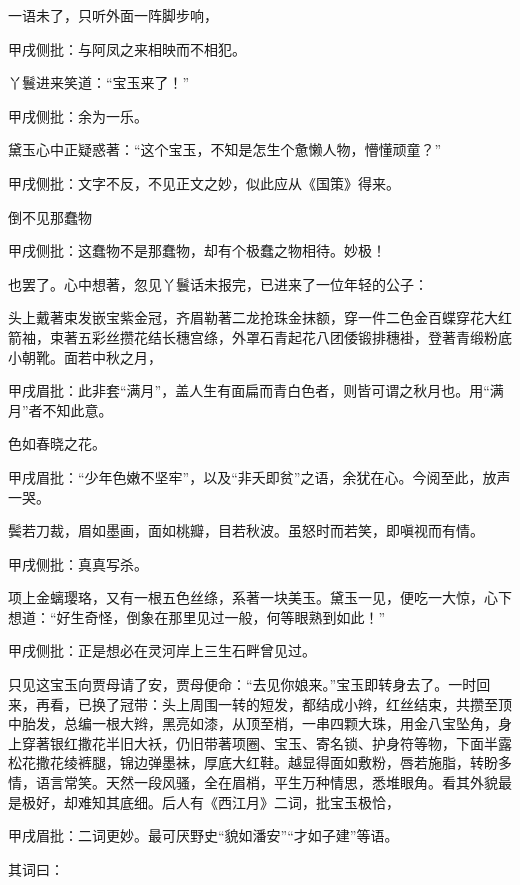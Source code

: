 \begin{parag}
    一语未了，只听外面一阵脚步响，\begin{note}甲戌侧批：与阿凤之来相映而不相犯。\end{note}丫鬟进来笑道：“宝玉来了！”\begin{note}甲戌侧批：余为一乐。\end{note}黛玉心中正疑惑著：“这个宝玉，不知是怎生个惫懒人物，懵懂顽童？”\begin{note}甲戌侧批：文字不反，不见正文之妙，似此应从《国策》得来。\end{note}倒不见那蠢物\begin{note}甲戌侧批：这蠢物不是那蠢物，却有个极蠢之物相待。妙极！\end{note}也罢了。心中想著，忽见丫鬟话未报完，已进来了一位年轻的公子：
\end{parag}

\begin{qute2sp}
    头上戴著束发嵌宝紫金冠，齐眉勒著二龙抢珠金抹额，穿一件二色金百蝶穿花大红箭袖，束著五彩丝攒花结长穗宫绦，外罩石青起花八团倭锻排穗褂，登著青缎粉底小朝靴。面若中秋之月，\begin{note}甲戌眉批：此非套“满月”，盖人生有面扁而青白色者，则皆可谓之秋月也。用“满月”者不知此意。\end{note}色如春晓之花。\begin{note}甲戌眉批：“少年色嫩不坚牢”，以及“非夭即贫”之语，余犹在心。今阅至此，放声一哭。\end{note}鬓若刀裁，眉如墨画，面如桃瓣，目若秋波。虽怒时而若笑，即嗔视而有情。
\end{qute2sp}

\begin{parag}
    \begin{note}甲戌侧批：真真写杀。\end{note}项上金螭璎珞，又有一根五色丝绦，系著一块美玉。黛玉一见，便吃一大惊，心下想道：“好生奇怪，倒象在那里见过一般，何等眼熟到如此！”\begin{note}甲戌侧批：正是想必在灵河岸上三生石畔曾见过。\end{note}只见这宝玉向贾母请了安，贾母便命：“去见你娘来。”宝玉即转身去了。一时回来，再看，已换了冠带：头上周围一转的短发，都结成小辫，红丝结束，共攒至顶中胎发，总编一根大辫，黑亮如漆，从顶至梢，一串四颗大珠，用金八宝坠角，身上穿著银红撒花半旧大袄，仍旧带著项圈、宝玉、寄名锁、护身符等物，下面半露松花撒花绫裤腿，锦边弹墨袜，厚底大红鞋。越显得面如敷粉，唇若施脂，转盼多情，语言常笑。天然一段风骚，全在眉梢，平生万种情思，悉堆眼角。看其外貌最是极好，却难知其底细。后人有《西江月》二词，批宝玉极恰，\begin{note}甲戌眉批：二词更妙。最可厌野史“貌如潘安”“才如子建”等语。\end{note}其词曰：
\end{parag}



